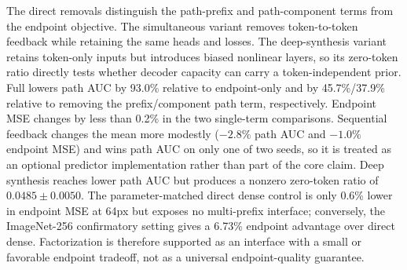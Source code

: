 The direct removals distinguish the path-prefix and path-component terms from
the endpoint objective. The simultaneous variant removes token-to-token
feedback while retaining the same heads and losses. The deep-synthesis variant
retains token-only inputs but introduces biased nonlinear layers, so its
zero-token ratio directly tests whether decoder capacity can carry a
token-independent prior. Full \method{} lowers path AUC by 93.0\% relative to
endpoint-only and by 45.7\%/37.9\% relative to removing the prefix/component
path term, respectively. Endpoint MSE changes by less than 0.2\% in the two
single-term comparisons. Sequential feedback changes the mean more modestly
($-2.8\%$ path AUC and $-1.0\%$ endpoint MSE) and wins path AUC on only one of
two seeds, so it is treated as an optional predictor implementation rather than
part of the core claim. Deep synthesis reaches lower path AUC but produces a
nonzero zero-token ratio of $0.0485\pm0.0050$.
The parameter-matched direct dense control is only 0.6\% lower in endpoint MSE
at 64px but exposes no multi-prefix interface; conversely, the ImageNet-256
confirmatory setting gives \method{} a 6.73\% endpoint advantage over direct
dense. Factorization is therefore supported as an interface with a small or
favorable endpoint tradeoff, not as a universal endpoint-quality guarantee.
